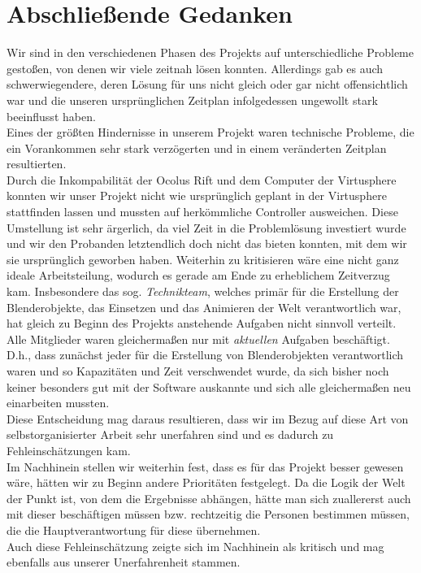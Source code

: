 \documentclass{Bericht}
\begin{document}
\section{Abschließende Gedanken}
	Wir sind in den verschiedenen Phasen des Projekts auf unterschiedliche Probleme gestoßen, von denen wir viele zeitnah lösen konnten. Allerdings gab es auch schwerwiegendere, deren Lösung für uns nicht gleich oder gar nicht offensichtlich war und die unseren ursprünglichen Zeitplan infolgedessen ungewollt stark beeinflusst haben.\\
	Eines der größten Hindernisse in unserem Projekt waren technische Probleme, die ein Vorankommen sehr stark verzögerten und in einem veränderten Zeitplan resultierten.\\
	Durch die Inkompabilität der Ocolus Rift und dem Computer der Virtusphere konnten wir unser Projekt nicht wie ursprünglich geplant in der Virtusphere stattfinden lassen und mussten auf herkömmliche Controller ausweichen. Diese Umstellung ist sehr ärgerlich, da viel Zeit in die Problemlösung investiert wurde und wir den Probanden letztendlich doch nicht das bieten konnten, mit dem wir sie ursprünglich geworben haben. 
	Weiterhin zu kritisieren wäre eine nicht ganz ideale Arbeitsteilung, wodurch es gerade am Ende zu erheblichem Zeitverzug kam. Insbesondere das sog. \textit{Technikteam}, welches primär für die Erstellung der Blenderobjekte, das Einsetzen und das Animieren der Welt verantwortlich war, hat gleich zu Beginn des Projekts anstehende Aufgaben nicht sinnvoll verteilt. Alle Mitglieder waren gleichermaßen nur mit \textit{aktuellen} Aufgaben beschäftigt. D.h., dass zunächst jeder für die Erstellung von Blenderobjekten verantwortlich waren und so Kapazitäten und Zeit verschwendet wurde, da sich bisher noch keiner besonders gut mit der Software auskannte und sich alle gleichermaßen neu einarbeiten mussten.\\
	Diese Entscheidung mag daraus resultieren, dass wir im Bezug auf diese Art von selbstorganisierter Arbeit sehr unerfahren sind und es dadurch zu Fehleinschätzungen kam.\\
	Im Nachhinein stellen wir weiterhin fest, dass es für das Projekt besser gewesen wäre, hätten wir zu Beginn andere Prioritäten festgelegt. Da die Logik der Welt der Punkt ist, von dem die Ergebnisse abhängen, hätte man sich zuallererst auch mit dieser beschäftigen müssen bzw. rechtzeitig die Personen bestimmen müssen, die die Hauptverantwortung für diese übernehmen.\\
	Auch diese Fehleinschätzung zeigte sich im Nachhinein als kritisch und mag ebenfalls aus unserer Unerfahrenheit stammen.
\end{document}
